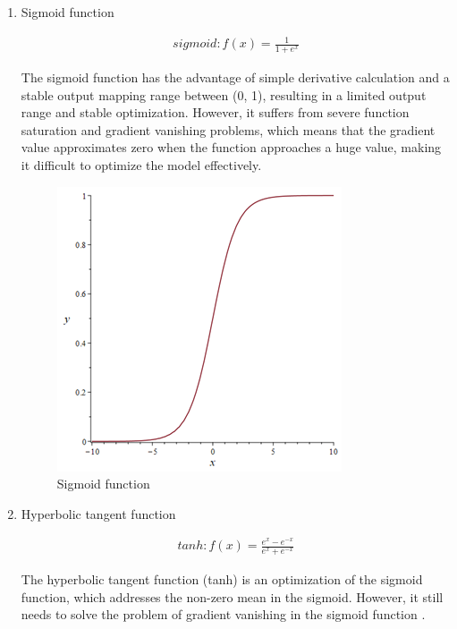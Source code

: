 \documentclass[10pt,journal,compsoc]{IEEEtran}
\begin{document}
\begin{enumerate}
    \item Sigmoid function

\begin{equation}
    \begin{aligned}
        sigmoid: f(x) = \frac{1}
                             {1 + e^x}
    \end{aligned}
\end{equation}

The sigmoid function has the advantage of simple derivative calculation and a stable output mapping range between (0, 1), resulting in a limited output range and stable optimization. However, it suffers from severe function saturation and gradient vanishing problems, which means that the gradient value approximates zero when the function approaches a huge value, making it difficult to optimize the model effectively.

\begin{figure}
    \centering
    \includegraphics[scale=0.6] {PNG/2-3.png}
    \caption{Sigmoid function}
    \label{fig:2-3}
\end{figure}

    \item Hyperbolic tangent function

\begin{equation}
    \begin{aligned}
        tanh: f(x) = \frac{e^x - e^{-x}}
                         {e^x + e^{-x}}
    \end{aligned}
\end{equation}

The hyperbolic tangent function (tanh) is an optimization of the sigmoid function, which addresses the non-zero mean in the sigmoid. However, it still needs to solve the problem of gradient vanishing in the sigmoid function \cite{9}.


\end{enumerate}
\end{document}
